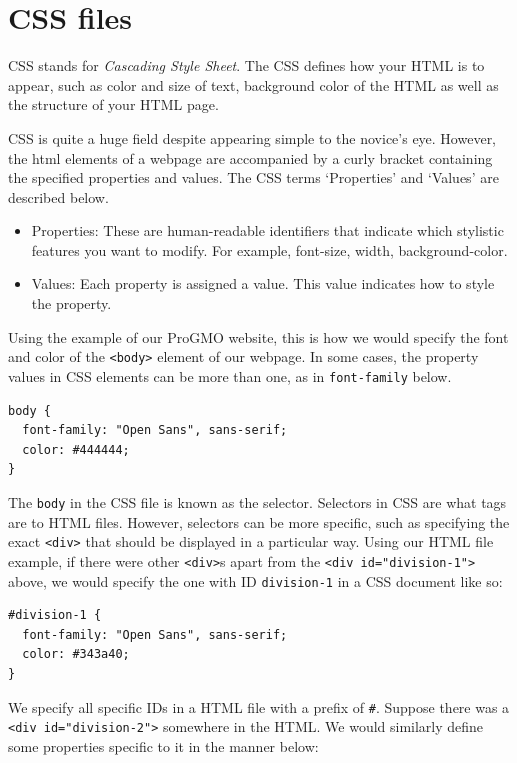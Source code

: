\documentclass[
]{book}
\begin{document}
\hypertarget{css-files}{%
\section{CSS files}\label{css-files}}

CSS stands for \emph{Cascading Style Sheet}. The CSS defines how your HTML is to appear, such as color and size of text, background color of the HTML as well as the structure of your HTML page.

CSS is quite a huge field despite appearing simple to the novice's eye. However, the html elements of a webpage are accompanied by a curly bracket containing the specified properties and values. The CSS terms `Properties' and `Values' are described below.

\begin{itemize}
\item
  Properties: These are human-readable identifiers that indicate which stylistic features you want to modify. For example, font-size, width, background-color.
\item
  Values: Each property is assigned a value. This value indicates how to style the property.
\end{itemize}

Using the example of our ProGMO website, this is how we would specify the font and color of the \texttt{\textless{}body\textgreater{}} element of our webpage. In some cases, the property values in CSS elements can be more than one, as in \texttt{font-family} below.

\begin{verbatim}
body {
  font-family: "Open Sans", sans-serif;
  color: #444444;
}
\end{verbatim}

The \texttt{body} in the CSS file is known as the selector. Selectors in CSS are what tags are to HTML files. However, selectors can be more specific, such as specifying the exact \texttt{\textless{}div\textgreater{}} that should be displayed in a particular way. Using our HTML file example, if there were other \texttt{\textless{}div\textgreater{}}s apart from the \texttt{\textless{}div\ id="division-1"\textgreater{}} above, we would specify the one with ID \texttt{division-1} in a CSS document like so:

\begin{verbatim}
#division-1 {
  font-family: "Open Sans", sans-serif;
  color: #343a40;
}
\end{verbatim}

We specify all specific IDs in a HTML file with a prefix of \texttt{\#}. Suppose there was a \texttt{\textless{}div\ id="division-2"\textgreater{}} somewhere in the HTML. We would similarly define some properties specific to it in the manner below:
\end{document}
